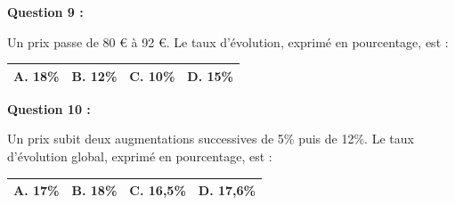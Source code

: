 \documentclass[12pt,a4paper]{article}
\begin{document}
\vspace{0.7cm}

\textbf{Question 9 :}
\vspace{5pt}

Un prix passe de 80 € à 92 €. Le taux d'évolution, exprimé en pourcentage, est :
\vspace{0.3cm}

\renewcommand{\arraystretch}{3}
\begin{tabular}{|m{3.4cm}|m{3.4cm}|m{3.4cm}|m{3.4cm}|}
\hline
\centering \vspace{-0.3cm} \textbf{A.} 18\% & 
\centering \vspace{-0.3cm} \textbf{B.} 12\% & 
\centering \vspace{-0.3cm} \textbf{C.} 10\% & 
\centering \vspace{-0.3cm} \textbf{D.} 15\% \tabularnewline
\hline
\end{tabular}

\vspace{0.7cm}

\textbf{Question 10 :}
\vspace{5pt}

Un prix subit deux augmentations successives de 5\% puis de 12\%. Le taux d'évolution global, exprimé en pourcentage, est :
\vspace{0.3cm}

\renewcommand{\arraystretch}{3}
\begin{tabular}{|m{3.4cm}|m{3.4cm}|m{3.4cm}|m{3.4cm}|}
\hline
\centering \vspace{-0.3cm} \textbf{A.} 17\% & 
\centering \vspace{-0.3cm} \textbf{B.} 18\% & 
\centering \vspace{-0.3cm} \textbf{C.} 16,5\% & 
\centering \vspace{-0.3cm} \textbf{D.} 17,6\% \tabularnewline
\hline
\end{tabular}
\end{document}
